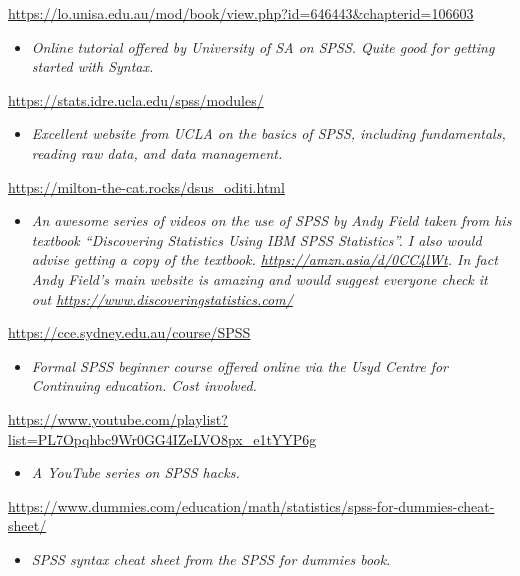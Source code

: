 \documentclass[
]{book}
\providecommand{\tightlist}{%
  \setlength{\itemsep}{0pt}\setlength{\parskip}{0pt}}
\begin{document}
\url{https://lo.unisa.edu.au/mod/book/view.php?id=646443\&chapterid=106603}

\begin{itemize}
\tightlist
\item
  \emph{Online tutorial offered by University of SA on SPSS. Quite good for getting started with Syntax.}
\end{itemize}

\url{https://stats.idre.ucla.edu/spss/modules/}

\begin{itemize}
\tightlist
\item
  \emph{Excellent website from UCLA on the basics of SPSS, including fundamentals, reading raw data, and data management.}
\end{itemize}

\url{https://milton-the-cat.rocks/dsus_oditi.html}

\begin{itemize}
\tightlist
\item
  \emph{An awesome series of videos on the use of SPSS by Andy Field taken from his textbook ``Discovering Statistics Using IBM SPSS Statistics''. I also would advise getting a copy of the textbook. \url{https://amzn.asia/d/0CC4lWt}. In fact Andy Field's main website is amazing and would suggest everyone check it out \url{https://www.discoveringstatistics.com/}}
\end{itemize}

\url{https://cce.sydney.edu.au/course/SPSS}

\begin{itemize}
\tightlist
\item
  \emph{Formal SPSS beginner course offered online via the Usyd Centre for Continuing education. Cost involved. }
\end{itemize}

\url{https://www.youtube.com/playlist?list=PL7Opqhbc9Wr0GG4IZeLVO8px_e1tYYP6g}

\begin{itemize}
\tightlist
\item
  \emph{A YouTube series on SPSS hacks.}
\end{itemize}

\url{https://www.dummies.com/education/math/statistics/spss-for-dummies-cheat-sheet/}

\begin{itemize}
\tightlist
\item
  \emph{SPSS syntax cheat sheet from the SPSS for dummies book. }
\end{itemize}
\end{document}
